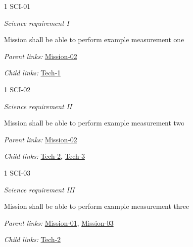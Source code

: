 \begin{frame}{1 SCI-01}

\emph{Science requirement I}

Mission shall be able to perform example measurement one

\emph{Parent links:} \href{L1.html\#Mission-02}{Mission-02}

\emph{Child links:} \href{L3.html\#Tech-1}{Tech-1}

\end{frame}

\begin{frame}{1 SCI-02}

\emph{Science requirement II}

Mission shall be able to perform example measurement two

\emph{Parent links:} \href{L1.html\#Mission-02}{Mission-02}

\emph{Child links:} \href{L3.html\#Tech-2}{Tech-2},
\href{L3.html\#Tech-3}{Tech-3}

\end{frame}

\begin{frame}{1 SCI-03}

\emph{Science requirement III}

Mission shall be able to perform example measurement three

\emph{Parent links:} \href{L1.html\#Mission-01}{Mission-01},
\href{L1.html\#Mission-03}{Mission-03}

\emph{Child links:} \href{L3.html\#Tech-2}{Tech-2}

\end{frame}
